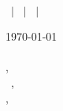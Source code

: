 \documentclass[12pt]{letter}
\begin{document}
\begin{center}
{\Large \myname}\\
\myemail\ $|$ \mylinkedin\ $|$ \myphone\ $|$ \mylocation
\end{center}

\today\\

\company\\
\city, \state\ \zip\\

\greeting\ \recipient,\\



\closer,\\
\myname\\
\mytitle
\end{document}
